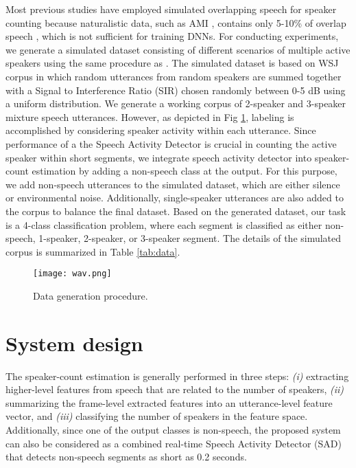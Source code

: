 \documentclass[a4paper]{article}
\begin{document}
Most previous studies \cite{stoter2018countnet,andrei2019overlapped} have employed simulated overlapping speech for speaker counting because naturalistic data, such as AMI \cite{carletta2005ami}, contains only 5-10\% of overlap speech \cite{von2019all}, which is not sufficient for training DNNs. For conducting experiments, we generate a simulated dataset consisting of different scenarios of multiple active speakers using the same procedure as \cite{yu2017permutation,luo2018tasnet}. The simulated dataset is based on WSJ corpus \cite{garofolo1993csr} in which random utterances from random speakers are summed together with a Signal to Interference Ratio (SIR) chosen randomly between 0-5 dB using a uniform distribution. We generate a working corpus of 2-speaker and 3-speaker mixture speech utterances. However, as depicted in Fig \ref{fig:data}, labeling is accomplished by considering speaker activity within each utterance. Since performance of a the Speech Activity Detector is crucial in counting the active speaker within short segments, we integrate speech activity detector into speaker-count estimation by adding a non-speech class at the output. For this purpose, we add non-speech utterances to the simulated dataset, which are either silence or environmental noise. Additionally, single-speaker utterances are also added to the corpus to balance the final dataset. Based on the generated dataset, our task is a 4-class classification problem, where each segment is classified as either non-speech, 1-speaker, 2-speaker, or 3-speaker segment. The details of the simulated corpus is summarized in Table \ref{tab:data}.

\begin{figure}
\centering
\texttt{[image: wav.png]}
\caption{Data generation procedure. }
\label{fig:data}
\vspace{-0.5cm}
\end{figure}



\section{System design}
\label{sec:sys}

The speaker-count estimation is generally performed in three steps: \emph{(i)} extracting higher-level features from speech that are related to the number of speakers, \emph{(ii)} summarizing the frame-level extracted features into an utterance-level feature vector, and \emph{(iii)} classifying the number of speakers in the feature space. Additionally, since one of the output classes is non-speech, the proposed system can also be considered as a combined real-time Speech Activity Detector (SAD) that detects non-speech segments as short as 0.2 seconds.
\end{document}
